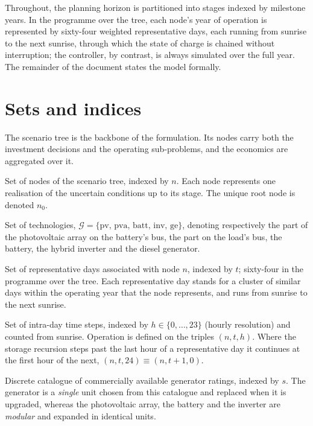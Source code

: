 \documentclass[11pt,a4paper]{article}
\theoremstyle{plain}
\theoremstyle{definition}
\begin{document}
Throughout, the planning horizon is partitioned into stages indexed by milestone years.
In the programme over the tree, each node's year of operation is represented by sixty-four
weighted representative days, each running from sunrise to the next sunrise, through which
the state of charge is chained without interruption; the controller, by contrast, is
always simulated over the full year. The remainder of the document states the model
formally.

\section{Sets and indices}
\label{sec:sets}

The scenario tree is the backbone of the formulation. Its nodes carry both the
investment decisions and the operating sub-problems, and the economics are aggregated
over it.

\begin{description}[leftmargin=2.2cm,style=nextline]
  \item[$\mathcal{N}$] Set of nodes of the scenario tree, indexed by $n$. Each node
  represents one realisation of the uncertain conditions up to its stage. The unique
  root node is denoted $n_0$.
  \item[$\mathcal{G}$] Set of technologies,
  $\mathcal{G}=\{\mathrm{pv},\,\mathrm{pva},\,\mathrm{batt},\,\mathrm{inv},\,\mathrm{ge}\}$,
  denoting respectively the part of the photovoltaic array on the battery's bus, the part
  on the load's bus, the battery, the hybrid inverter and the diesel generator.
  \item[$\mathcal{T}_n$] Set of representative days associated with node $n$, indexed by
  $t$; sixty-four in the programme over the tree. Each representative day stands for a
  cluster of similar days within the operating year that the node represents, and runs
  from sunrise to the next sunrise.
  \item[$\mathcal{H}$] Set of intra-day time steps, indexed by $h\in\{0,\dots,23\}$
  (hourly resolution) and counted from sunrise. Operation is defined on the triples
  $(n,t,h)$. Where the storage recursion steps past the last hour of a representative day
  it continues at the first hour of the next, $(n,t,24)\equiv(n,t+1,0)$.
  \item[$\mathcal{S}_{\mathrm{ge}}$] Discrete catalogue of commercially available
  generator ratings, indexed by $s$. The generator is a \emph{single} unit chosen from
  this catalogue and replaced when it is upgraded, whereas the photovoltaic array, the
  battery and the inverter are \emph{modular} and expanded in identical units.
\end{description}
\end{document}
